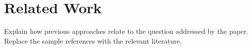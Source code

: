 \section{Related Work}
\label{sec:related-work}
Explain how previous approaches relate to the question addressed by the
paper. Replace the sample references with the relevant literature.
